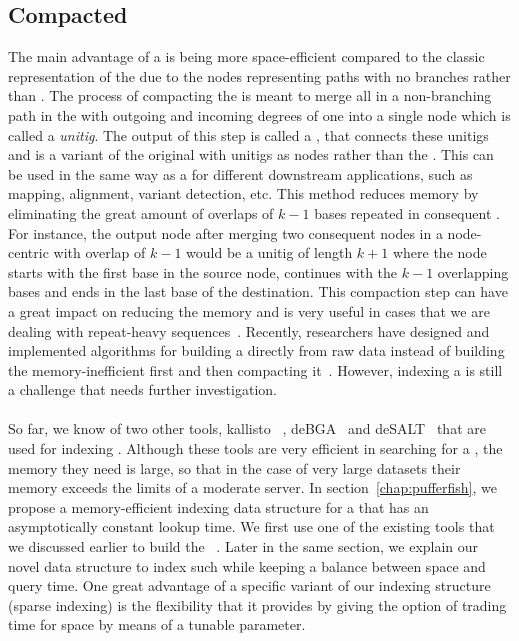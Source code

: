 \subsection{Compacted \dbg}
\label{subsubsec:cdbg}
The main advantage of a \ccdbg is being more space-efficient compared to the
classic representation of the \dbg due to the nodes representing
paths with no branches rather than \kmers.
The process of compacting the \dbg is meant to merge all \kmers in a non-branching path
in the \dbg with outgoing and incoming degrees of
one into a single node which is called a \emph{unitig}.
The output of this step is called a \compdbg,
that connects these unitigs and is a variant of the original \dbg
with unitigs as nodes rather than the \kmers.
This can be used in the same way as a \dbg for different downstream applications,
such as mapping, alignment, variant detection, etc.
This method reduces memory by eliminating the great amount of overlaps of $k-1$ bases
repeated in consequent \kmers.
For instance, the output node after merging two consequent nodes in a node-centric \dbg
with overlap of $k-1$ would be a unitig of length $k+1$ where the node starts with the first base in the source node,
continues with the $k-1$ overlapping bases and ends in
the last base of the destination.
This compaction step can have a great impact on reducing the memory
and is very useful in cases that we are dealing with repeat-heavy sequences~\cite{liu2016debga}.
Recently, researchers have designed and implemented algorithms for building
a \ccdbg directly from raw data instead of building the memory-inefficient \dbg first
and then compacting it~\cite{minkin2016twopaco,chikhi2016compacting}.
However, indexing a \ccdbg is still a challenge that needs further investigation.

\paragraph*{}
So far, we know of two other tools, kallisto~\cite{Bray2016Kallisto}
, deBGA~\cite{liu2016debga} and deSALT~\cite{} that are used for indexing \ccdbgs.
Although these tools are very efficient in searching for a \kmer, the memory they need is large,
so that in the case of very large datasets their memory exceeds the limits of a moderate server.
In section~\ref{chap:pufferfish}, we propose a memory-efficient indexing data structure
for a \ccdbg that has an asymptotically constant \kmer lookup time.
We first use one of the existing tools that we discussed earlier to build the \ccdbg~\cite{minkin2016twopaco}.
Later in the same section, we explain our novel data structure to index such \ccdbgs
while keeping a balance between space and query time.
One great advantage of a specific variant of our indexing structure (sparse indexing)
is the flexibility that it provides by giving the option of trading time for space
by means of a tunable parameter.


